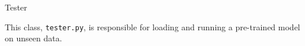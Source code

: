 \begin{section}{Tester}
    \par This class, \texttt{tester.py}, is responsible for loading and running a pre-trained model on unseen data.
    
\end{section}
\clearpage